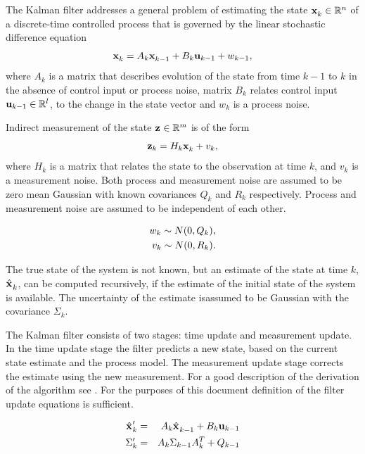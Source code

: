 The Kalman filter addresses a general problem of estimating the state $
\x{k}{}{} \in \Rset^n$ of a discrete-time controlled process that is
governed by the linear stochastic difference equation
\begin{equation}
\x{k}{}{} = A_k \x{k-1}{}{} + B_k \U{k-1} + w_{k-1},
\label{eqn:kalman_process}
\end{equation}
where $A_k$ is a matrix that describes evolution of the state from
time $k-1$ to $k$ in the absence of control input or process
noise, matrix $B_k$ relates control input ${\bf u}_{k-1} \in {\mathbb R}^l$, to
the change in the state vector and $w_k$ is a process noise.

Indirect measurement of the state ${\bf z}_{} \in {\mathbb R}^m$ is of the form
\begin{equation}
\z{k} = H_k \x{k}{}{} + v_k,
\label{eqn:kalman_obs}
\end{equation}
where $H_k$ is a matrix that relates the state to the observation at
time $k$, and $v_k$ is a measurement noise. Both process and
measurement noise are assumed to be zero mean Gaussian with known
covariances $Q_k$ and $R_k$ respectively. Process and measurement
noise are assumed to be independent of each other.

\begin{eqnarray}
w_k \sample{}{} N(0,Q_k),\\
v_k \sample{}{} N(0,R_k).
\end{eqnarray}


The true state of the system is not known, but an estimate of the
state at time $k$, $\hat{\x{}{}{}}_k$, can be computed recursively, if
the estimate of the initial state of the system is available. The
uncertainty of the estimate isassumed to be  Gaussian with the covariance
$\Sigma_k$.

The Kalman filter consists of two stages: time update and measurement
update. In the time update stage the filter predicts a new state,
based on the current state estimate and the process model. The
measurement update stage corrects the estimate using the new
measurement. For a good description of the derivation of the algorithm
see \cite{kalman_intro}. For the purposes of this document definition
of the filter update equations is sufficient.


\begin{eqnarray}
\label{eqn:kalman_x_u}
\hat{\x{}{}{}}_k^\prime &=& A_k \hat{\x{}{}{}}_{k-1} + B_k \U{k-1}\\
\label{eqn:kalman_sigma_u}
\Sigma_k^\prime &=& A_k \Sigma_{k-1} A_k^T + Q_{k-1}
\end{eqnarray}

